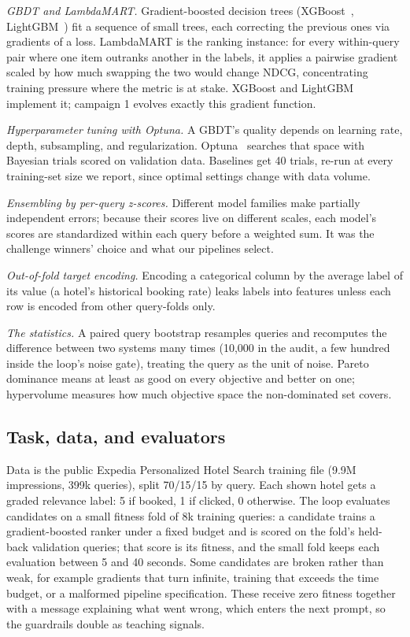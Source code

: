 \documentclass[]{ceurart}
\begin{document}
\emph{GBDT and LambdaMART.} Gradient-boosted decision trees
(XGBoost~\cite{xgboost}, LightGBM~\cite{lightgbm}) fit a sequence of small trees, each correcting the previous ones via
gradients of a loss. LambdaMART is the ranking instance:
for every within-query pair where one item outranks another in the
labels, it applies a pairwise gradient scaled by how much swapping the two
would change NDCG, concentrating training pressure where the metric is at
stake. XGBoost and LightGBM implement it; campaign 1 evolves exactly this
gradient function.

\emph{Hyperparameter tuning with Optuna.} A GBDT's quality depends on
learning rate, depth, subsampling, and regularization. Optuna~\cite{optuna}
searches that space with Bayesian trials scored on validation data. Baselines get 40 trials, re-run at every training-set size we report,
since optimal settings change with data volume.

\emph{Ensembling by per-query z-scores.} Different model families make
partially independent errors; because their scores live on different scales,
each model's scores are standardized within each query before a weighted
sum. It was the challenge winners' choice and what our pipelines select.

\emph{Out-of-fold target encoding.} Encoding a categorical column by the average label of its value (a
hotel's historical booking rate) leaks labels into features unless each row
is encoded from other query-folds only.

\emph{The statistics.} A paired query bootstrap resamples queries and recomputes the difference
between two systems many times (10,000 in the audit, a few hundred inside
the loop's noise gate), treating the query as the unit of noise. Pareto dominance
means at least as good on every objective and better on one; hypervolume
measures how much objective space the non-dominated set covers.

\subsection{Task, data, and evaluators}
Data is the public Expedia Personalized Hotel Search training file (9.9M
impressions, 399k queries), split 70/15/15 by query. Each shown hotel gets a
graded relevance label: 5 if booked, 1 if clicked, 0 otherwise. The loop
evaluates candidates on a small fitness fold of 8k training queries: a candidate trains a gradient-boosted ranker under a fixed budget and is
scored on the fold's held-back validation queries; that score is its
fitness, and the small fold keeps each evaluation between 5 and 40 seconds. Some
candidates are broken rather than weak, for example gradients that turn
infinite, training that exceeds the time budget, or a malformed pipeline
specification. These receive zero fitness together with a message explaining
what went wrong, which enters the next prompt, so the guardrails double as
teaching signals.
\end{document}
